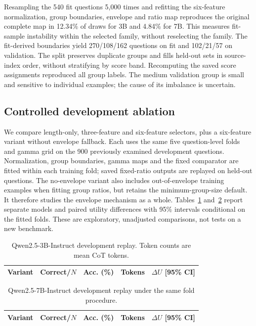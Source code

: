 \documentclass[a4paper,runningheads]{llncs}
\begin{document}
Resampling the 540 fit questions 5,000 times and refitting the six-feature normalization, group boundaries, envelope and ratio map reproduces the original complete map in 12.34\% of draws for 3B and 4.84\% for 7B. This measures fit-sample instability within the selected family, without reselecting the family. The fit-derived boundaries yield 270/108/162 questions on fit and 102/21/57 on validation. The split preserves duplicate groups and fills held-out sets in source-index order, without stratifying by score band. Recomputing the saved score assignments reproduced all group labels. The medium validation group is small and sensitive to individual examples; the cause of its imbalance is uncertain.

\subsection{Controlled development ablation}
We compare length-only, three-feature and six-feature selectors, plus a six-feature variant without envelope fallback. Each uses the same five question-level folds and gamma grid on the 900 previously examined development questions. Normalization, group boundaries, gamma maps and the fixed comparator are fitted within each training fold; saved fixed-ratio outputs are replayed on held-out questions. The no-envelope variant also includes out-of-envelope training examples when fitting group ratios, but retains the minimum-group-size default. It therefore studies the envelope mechanism as a whole. Tables~\ref{tab:ablation3} and~\ref{tab:ablation7} report separate models and paired utility differences with 95\% intervals conditional on the fitted folds. These are exploratory, unadjusted comparisons, not tests on a new benchmark.

\begin{table}[H]\centering\small
\caption{Qwen2.5-3B-Instruct development replay. Token counts are mean CoT tokens.}
\label{tab:ablation3}
\begin{tabular}{lrrrr}\toprule
Variant & Correct/$N$ & Acc. (\%) & Tokens & $\Delta U$ [95\% CI]\\\midrule

\end{tabular}\end{table}

\begin{table}[H]\centering\small
\caption{Qwen2.5-7B-Instruct development replay under the same fold procedure.}
\label{tab:ablation7}
\begin{tabular}{lrrrr}\toprule
Variant & Correct/$N$ & Acc. (\%) & Tokens & $\Delta U$ [95\% CI]\\\midrule

\end{tabular}\end{table}
\end{document}
